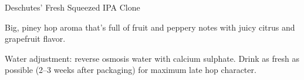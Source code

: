 \begin{recipe}{Deschutes' Fresh Squeezed IPA Clone}

\begin{aboutblock}
Big, piney hop aroma that's full of fruit and peppery notes with juicy citrus
and grapefruit flavor. \sourceaha
\end{aboutblock}


\begin{methodandtiming}
 
\begin{mashsteps}
\end{mashsteps}

\begin{fermentationsteps}
\end{fermentationsteps}

\begin{directions}
Water adjustment: reverse osmosis water with  calcium sulphate.
Drink as fresh as possible (2--3 weeks after packaging) for maximum late
hop character.
\end{directions}

\end{methodandtiming}

\recipebreak

\begin{ingredientsblock}

\begin{malts}
\end{malts}

\begin{hops}

\end{hops}


\end{ingredientsblock}

\end{recipe}

